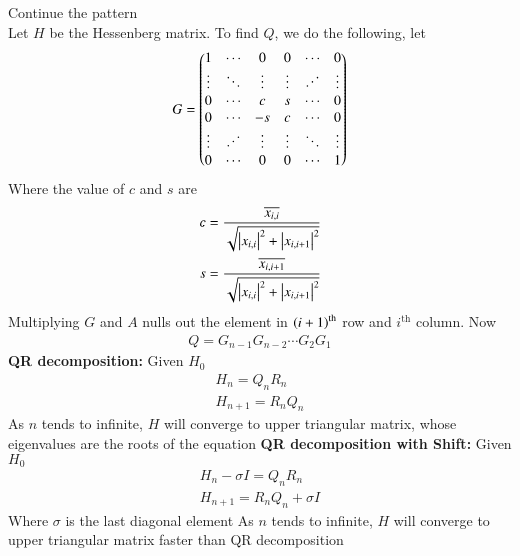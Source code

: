 \documentclass[journal]{IEEEtran}
\begin{document}
Continue the pattern\\
Let $H$ be the Hessenberg matrix. To find $Q$, we do the following, let
\begin{align}
G = \myvec{
1 & \cdots & 0 & 0 & \cdots & 0 \\
\vdots & \ddots & \vdots & \vdots & \reflectbox{$\ddots$} & \vdots \\
0 & \cdots & c & s & \cdots & 0\\
0 & \cdots & -s & c & \cdots & 0\\
\vdots & \reflectbox{$\ddots$} & \vdots & \vdots & \ddots & \vdots\\
0 & \cdots & 0 & 0 & \cdots & 1
}
\end{align}
Where the value of $c$ and $s$ are
\begin{align}
	c = \frac{\overline{x_{i,i}}}{\sqrt{\left\vert x_{i,i}\right\vert^2+\left\vert x_{i,i+1}\right\vert^2}}\\
	s = \frac{\overline{x_{i,i+1}}}{\sqrt{\left\vert x_{i,i}\right\vert^2+\left\vert x_{i,i+1}\right\vert^2}}
\end{align}
Multiplying $G$ and $A$ nulls out the element in $\left(i+1\right)^{\text{th}}$ row and $i^\text{th}$ column. Now
\begin{align}
	Q = G_{n-1}G_{n-2}\cdots G_2G_1
\end{align}
\newline
\textbf{QR decomposition:}\newline
Given $H_0$
\begin{align}
	H_n = Q_nR_n\\
	H_{n+1} = R_nQ_n
\end{align}
As $n$ tends to infinite, $H$ will converge to upper triangular matrix, whose eigenvalues are the roots of the equation\newline
\textbf{QR decomposition with Shift:}\newline
Given $H_0$
\begin{align}
	H_n - \sigma I = Q_nR_n\\
	H_{n+1} = R_nQ_n + \sigma I
\end{align}
Where $\sigma$ is the last diagonal element
As $n$ tends to infinite, $H$ will converge to upper triangular matrix faster than QR decomposition
\end{document}
